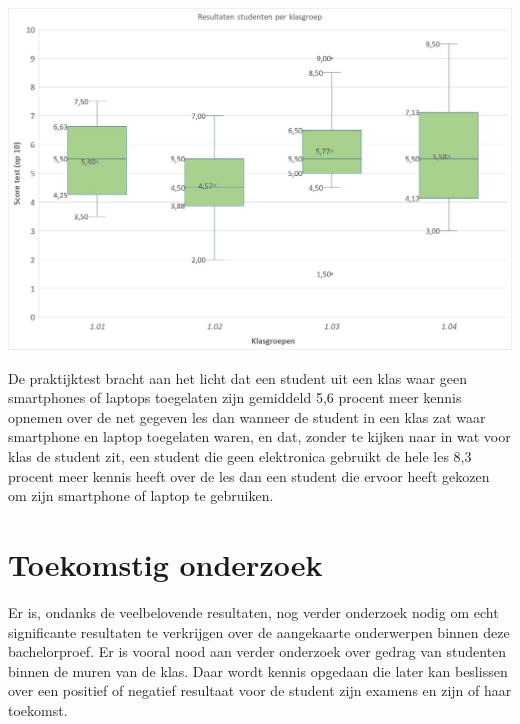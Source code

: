 \documentclass[a0,portrait]{a0poster}
\begin{document}
\begin{multicols}{2}
\begin{center}
\end{center}\vspace{1cm}

\begin{center}\vspace{1cm}
	\includegraphics[scale=0.8]{Boxplot3.jpg}
\end{center}\vspace{1cm}

De praktijktest bracht aan het licht dat een student uit een klas waar geen smartphones of
laptops toegelaten zijn gemiddeld 5,6 procent meer kennis opnemen over de net gegeven
les dan wanneer de student in een klas zat waar smartphone en laptop toegelaten waren, en
dat, zonder te kijken naar in wat voor klas de student zit, een student die geen elektronica
gebruikt de hele les 8,3 procent meer kennis heeft over de les dan een student die ervoor
heeft gekozen om zijn smartphone of laptop te gebruiken.
\color{HoGentAccent1} 
\section*{Toekomstig onderzoek}
\color{black}
Er is, ondanks de veelbelovende resultaten, nog verder onderzoek nodig om echt significante resultaten te verkrijgen over
de aangekaarte onderwerpen binnen deze bachelorproef. Er is vooral nood aan verder
onderzoek over gedrag van studenten binnen de muren van de klas. Daar wordt kennis
opgedaan die later kan beslissen over een positief of negatief resultaat voor de student zijn
examens en zijn of haar toekomst.

\end{multicols}
\end{document}
